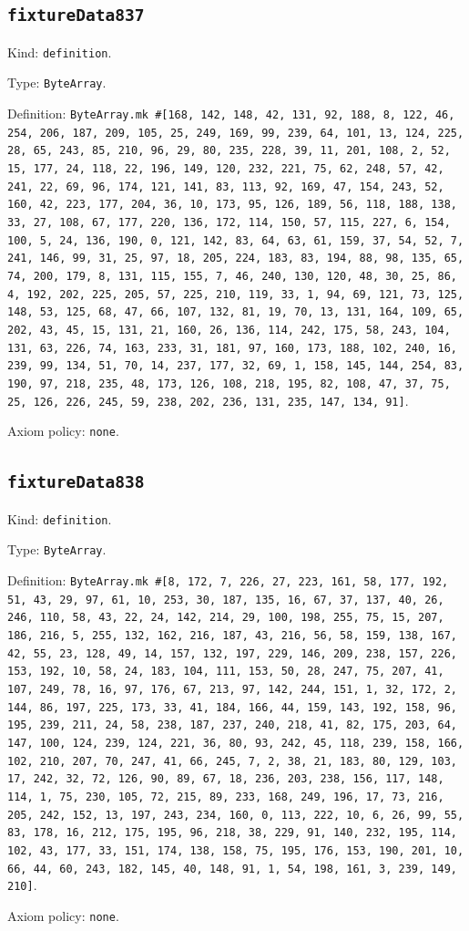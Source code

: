 \documentclass[11pt]{article}
\begin{document}
\subsection*{\texttt{fixtureData837}}
\noindent Kind: \texttt{definition}.\par
\noindent Type: \texttt{ByteArray}.\par
\noindent Definition: \texttt{ByteArray.mk \#[168, 142, 148, 42, 131, 92, 188, 8, 122, 46, 254, 206, 187, 209, 105, 25, 249, 169, 99, 239, 64, 101, 13, 124, 225, 28, 65, 243, 85, 210, 96, 29, 80, 235, 228, 39, 11, 201, 108, 2, 52, 15, 177, 24, 118, 22, 196, 149, 120, 232, 221, 75, 62, 248, 57, 42, 241, 22, 69, 96, 174, 121, 141, 83, 113, 92, 169, 47, 154, 243, 52, 160, 42, 223, 177, 204, 36, 10, 173, 95, 126, 189, 56, 118, 188, 138, 33, 27, 108, 67, 177, 220, 136, 172, 114, 150, 57, 115, 227, 6, 154, 100, 5, 24, 136, 190, 0, 121, 142, 83, 64, 63, 61, 159, 37, 54, 52, 7, 241, 146, 99, 31, 25, 97, 18, 205, 224, 183, 83, 194, 88, 98, 135, 65, 74, 200, 179, 8, 131, 115, 155, 7, 46, 240, 130, 120, 48, 30, 25, 86, 4, 192, 202, 225, 205, 57, 225, 210, 119, 33, 1, 94, 69, 121, 73, 125, 148, 53, 125, 68, 47, 66, 107, 132, 81, 19, 70, 13, 131, 164, 109, 65, 202, 43, 45, 15, 131, 21, 160, 26, 136, 114, 242, 175, 58, 243, 104, 131, 63, 226, 74, 163, 233, 31, 181, 97, 160, 173, 188, 102, 240, 16, 239, 99, 134, 51, 70, 14, 237, 177, 32, 69, 1, 158, 145, 144, 254, 83, 190, 97, 218, 235, 48, 173, 126, 108, 218, 195, 82, 108, 47, 37, 75, 25, 126, 226, 245, 59, 238, 202, 236, 131, 235, 147, 134, 91]}.\par
\noindent Axiom policy: \texttt{none}.\par
\subsection*{\texttt{fixtureData838}}
\noindent Kind: \texttt{definition}.\par
\noindent Type: \texttt{ByteArray}.\par
\noindent Definition: \texttt{ByteArray.mk \#[8, 172, 7, 226, 27, 223, 161, 58, 177, 192, 51, 43, 29, 97, 61, 10, 253, 30, 187, 135, 16, 67, 37, 137, 40, 26, 246, 110, 58, 43, 22, 24, 142, 214, 29, 100, 198, 255, 75, 15, 207, 186, 216, 5, 255, 132, 162, 216, 187, 43, 216, 56, 58, 159, 138, 167, 42, 55, 23, 128, 49, 14, 157, 132, 197, 229, 146, 209, 238, 157, 226, 153, 192, 10, 58, 24, 183, 104, 111, 153, 50, 28, 247, 75, 207, 41, 107, 249, 78, 16, 97, 176, 67, 213, 97, 142, 244, 151, 1, 32, 172, 2, 144, 86, 197, 225, 173, 33, 41, 184, 166, 44, 159, 143, 192, 158, 96, 195, 239, 211, 24, 58, 238, 187, 237, 240, 218, 41, 82, 175, 203, 64, 147, 100, 124, 239, 124, 221, 36, 80, 93, 242, 45, 118, 239, 158, 166, 102, 210, 207, 70, 247, 41, 66, 245, 7, 2, 38, 21, 183, 80, 129, 103, 17, 242, 32, 72, 126, 90, 89, 67, 18, 236, 203, 238, 156, 117, 148, 114, 1, 75, 230, 105, 72, 215, 89, 233, 168, 249, 196, 17, 73, 216, 205, 242, 152, 13, 197, 243, 234, 160, 0, 113, 222, 10, 6, 26, 99, 55, 83, 178, 16, 212, 175, 195, 96, 218, 38, 229, 91, 140, 232, 195, 114, 102, 43, 177, 33, 151, 174, 138, 158, 75, 195, 176, 153, 190, 201, 10, 66, 44, 60, 243, 182, 145, 40, 148, 91, 1, 54, 198, 161, 3, 239, 149, 210]}.\par
\noindent Axiom policy: \texttt{none}.\par
\end{document}
